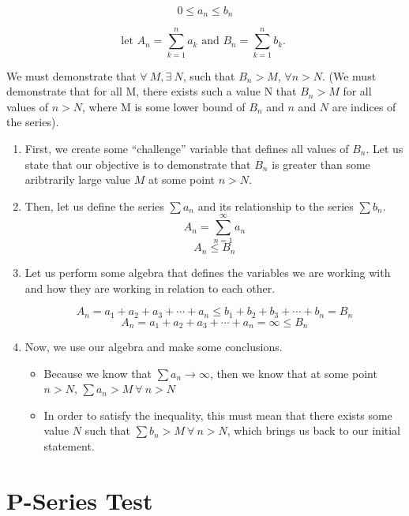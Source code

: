 \documentclass{report}
\begin{document}
\begin{sloppypar}
\[ 0 \leq a_{n} \leq b_{n} \]

\[\textrm{let $A_{n} = \sum_{k=1}^{n} a_{k}$ and
    $B_n = \sum_{k=1}^{n}b_{k}$. }\]

We must demonstrate that $\forall~ M, \exists ~ N $, such that
$ B_{n} > M $, $\forall n > N $. (We must demonstrate
that for all M, there exists such a value N that
$ B_{n} > M $ for all values of $ n > N $, where
M is some lower bound of $ B_{n} $ and $ n$ and $ N$ are indices
of the series).
\begin{enumerate}
  \item First, we create some ``challenge'' variable
        that defines all values of $ B_{n} $. Let
        us state that our objective is to demonstrate that  $ B_{n} $ is
        greater than some aribtrarily large value
        $ M $ at some point $ n > N $.
  \item Then, let us define the series $ \sum a_{n}$
        and its relationship to the series $ \sum b_{n}$.
        \[ A_{n} = \sum_{n=1}^{\infty} a_{n}\]
        \[ A_{n} \leq B_{n} \]
  \item Let us perform some algebra that
        defines the variables we are working
        with and how they are working in relation
        to each other.

\[ A_{n} = a_{1} + a_{2} + a_{3} + \cdots +
  a_{n} \leq b_{1} + b_{2} + b_{3} + \cdots + b_{n}
  = B_{n} \]
        \[ A_{n} = a_{1} + a_{2} + a_{3} + \cdots +
        a_{n} = \infty \leq B_{n} \]
  \item Now, we use our algebra and make some
        conclusions.
        \begin{itemize}
          \item Because we know that $ \sum a_{n}
                \rightarrow \infty$, then we know
                that at some point $ n > N $,
                $ \sum a_{n} > M ~ \forall ~ n > N $
          \item In order to satisfy the inequality,
                this must mean that there exists
                some value $ N $ such that $ \sum b_{n}
                > M ~ \forall ~ n > N $, which
                brings us back to our initial statement.
        \end{itemize}


\end{enumerate}

\section{P-Series Test}
\begin{center}
\end{center}
\end{sloppypar}
\end{document}
